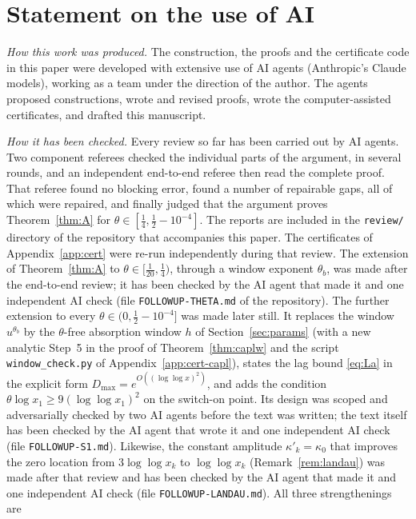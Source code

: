 \section{Statement on the use of AI}\label{app:ai}

\emph{How this work was produced.} The construction, the proofs and the certificate code in this paper were developed with
extensive use of AI agents (Anthropic's Claude models), working as a team under the direction of the author. The agents proposed
constructions, wrote and revised proofs, wrote the computer-assisted certificates, and drafted this manuscript.

\emph{How it has been checked.} Every review so far has been carried out by AI agents. Two component referees checked the individual
parts of the argument, in several rounds, and an independent end-to-end referee then read the complete proof. That referee found no
blocking error, found a number of repairable gaps, all of which were repaired, and finally judged that the argument proves
Theorem~\ref{thm:A} for $\theta\in[\tfrac14,\tfrac12-10^{-4}]$. The reports are included in the \texttt{review/} directory of the
repository that accompanies this paper. The certificates of Appendix~\ref{app:cert} were re-run independently during that review.
The extension of Theorem~\ref{thm:A} to $\theta\in[\tfrac1{20},\tfrac14)$, through a window exponent $\theta_b$, was made after the
end-to-end review; it has been checked by the AI agent that made it and one independent AI check (file \texttt{FOLLOWUP-THETA.md}
of the repository). The further extension to every $\theta\in(0,\tfrac12-10^{-4}]$ was made later still. It replaces the window
$u^{\theta_b}$ by the $\theta$-free absorption window $h$ of Section~\ref{sec:params} (with a new analytic Step~5 in the proof of
Theorem~\ref{thm:caplw} and the script \texttt{window\_check.py} of Appendix~\ref{app:cert-capl}), states the lag bound
\eqref{eq:La} in the explicit form $D_{\max}=e^{O((\log\log x)^2)}$, and adds the condition $\theta\log x_1\ge9(\log\log x_1)^2$ on the
switch-on point. Its design was scoped and adversarially checked by two AI agents before the text was written; the text itself has been
checked by the AI agent that wrote it and one independent AI check (file \texttt{FOLLOWUP-S1.md}). Likewise, the constant amplitude $\kappa'_k=\kappa_0$ that improves
the zero location from $3\log\log x_k$ to $\log\log x_k$ (Remark~\ref{rem:landau}) was made after that review and has been checked
by the AI agent that made it and one independent AI check (file \texttt{FOLLOWUP-LANDAU.md}). All three strengthenings are
